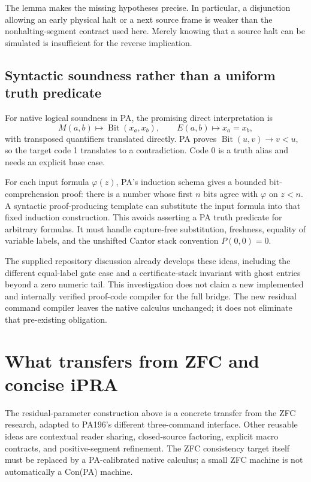 \documentclass[11pt,letterpaper]{article}
\begin{document}
The lemma makes the missing hypotheses precise. In particular, a disjunction
allowing an early physical halt or a next source frame is weaker than the
nonhalting-segment contract used here. Merely knowing that a source halt
can be simulated is insufficient for the reverse implication.

\subsection{Syntactic soundness rather than a uniform truth predicate}

For native logical soundness in PA, the promising direct interpretation is
\[
 M(a,b)\mapsto\operatorname{Bit}(x_a,x_b),\qquad
 E(a,b)\mapsto x_a=x_b,
\]
with transposed quantifiers translated directly. PA proves
$\operatorname{Bit}(u,v)\to v<u$, so the target code 1 translates to
a contradiction. Code 0 is a truth alias and needs an explicit base case.

For each input formula $\varphi(z)$, PA's induction schema gives a bounded
bit-comprehension proof: there is a number whose first $n$ bits agree with
$\varphi$ on $z<n$. A syntactic proof-producing template can substitute
the input formula into that fixed induction construction. This avoids
asserting a PA truth predicate for arbitrary formulas. It must handle
capture-free substitution, freshness, equality of variable labels, and
the unshifted Cantor stack convention $P(0,0)=0$.

The supplied repository discussion already develops these ideas, including
the different equal-label gate case and a certificate-stack invariant with
ghost entries beyond a zero numeric tail. This investigation does not
claim a new implemented and internally verified proof-code compiler for
the full bridge. The new residual command compiler leaves the native
calculus unchanged; it does not eliminate that pre-existing obligation.

\section{What transfers from ZFC and concise iPRA}

The residual-parameter construction above is a concrete transfer from
the ZFC research, adapted to PA196's different three-command interface.
Other reusable ideas are contextual reader sharing, closed-source
factoring, explicit macro contracts, and positive-segment refinement.
The ZFC consistency target itself must be replaced by a PA-calibrated
native calculus; a small ZFC machine is not automatically a Con(PA) machine.
\end{document}
